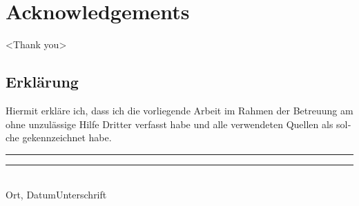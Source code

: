 

\printbibliography
\cleardoublepage
\pagestyle{empty}
\section*{Acknowledgements} %
<Thank you>
\cleardoublepage
\begin{german}
\section*{Erklärung} 
Hiermit erkläre ich, dass ich die vorliegende Arbeit im Rahmen der Betreuung am
\institut{} ohne unzulässige Hilfe Dritter verfasst habe und alle verwendeten
Quellen als solche gekennzeichnet habe.

\vspace{5\baselineskip}
\noindent
\rule[0.5ex]{20em}{0.5pt}\rule[0.5ex]{10em}{0.5pt}\\
Ort, Datum\hspace{8em}Unterschrift
\end{german}
